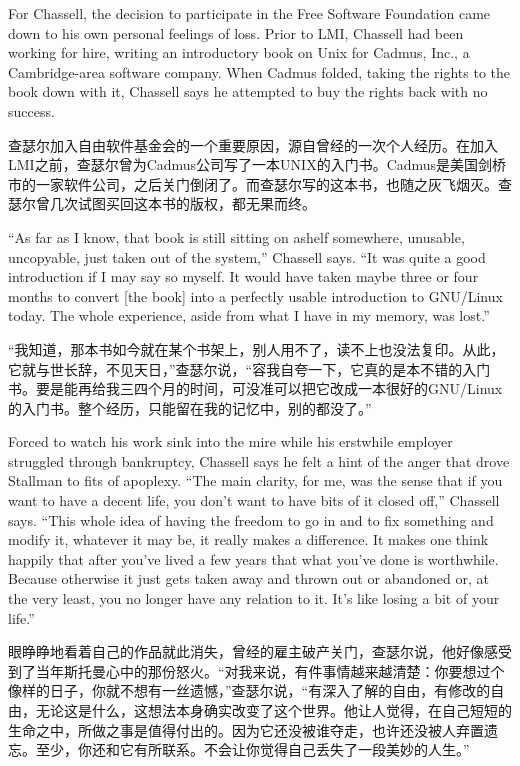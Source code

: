 \ifdefined\eng
For Chassell, the decision to participate in the Free Software Foundation came down to his own personal feelings of loss. Prior to LMI, Chassell had been working for hire, writing an introductory book on Unix for Cadmus, Inc., a Cambridge-area software company. When Cadmus folded, taking the rights to the book down with it, Chassell says he attempted to buy the rights back with no success.
\fi

\ifdefined\chs
查瑟尔加入自由软件基金会的一个重要原因，源自曾经的一次个人经历。在加入LMI之前，查瑟尔曾为Cadmus公司写了一本UNIX的入门书。Cadmus是美国剑桥市的一家软件公司，之后关门倒闭了。而查瑟尔写的这本书，也随之灰飞烟灭。查瑟尔曾几次试图买回这本书的版权，都无果而终。
\fi

\ifdefined\eng
``As far as I know, that book is still sitting on \ifdefined\vtwo a\fi shelf somewhere, unusable, uncopyable, just taken out of the system,'' Chassell says. ``It was quite a good introduction if I may say so myself. It would have taken maybe three or four months to convert [the book] into a perfectly usable introduction to GNU/Linux today. The whole experience, aside from what I have in my memory, was lost.''
\fi

\ifdefined\chs
``我知道，那本书如今就在某个书架上，别人用不了，读不上也没法复印。从此，它就与世长辞，不见天日，''查瑟尔说，``容我自夸一下，它真的是本不错的入门书。要是能再给我三四个月的时间，可没准可以把它改成一本很好的GNU/Linux的入门书。整个经历，只能留在我的记忆中，别的都没了。''
\fi

\ifdefined\eng
Forced to watch his work sink into the mire while his erstwhile employer struggled through bankruptcy, Chassell says he felt a hint of the anger that drove Stallman to fits of apoplexy. ``The main clarity, for me, was the sense that if you want to have a decent life, you don't want to have bits of it closed off,'' Chassell says. ``This whole idea of having the freedom to go in and to fix something and modify it, whatever it may be, it really makes a difference. It makes one think happily that after you've lived a few years that what you've done is worthwhile. Because otherwise it just gets taken away and thrown out or abandoned or, at the very least, you no longer have any relation to it. It's like losing a bit of your life.''
\fi

\ifdefined\chs
眼睁睁地看着自己的作品就此消失，曾经的雇主破产关门，查瑟尔说，他好像感受到了当年斯托曼心中的那份怒火。``对我来说，有件事情越来越清楚：你要想过个像样的日子，你就不想有一丝遗憾，''查瑟尔说，``有深入了解的自由，有修改的自由，无论这是什么，这想法本身确实改变了这个世界。他让人觉得，在自己短短的生命之中，所做之事是值得付出的。因为它还没被谁夺走，也许还没被人弃置遗忘。至少，你还和它有所联系。不会让你觉得自己丢失了一段美妙的人生。''
\fi

\bigskip

\theendnotes
\setcounter{endnote}{0
}
